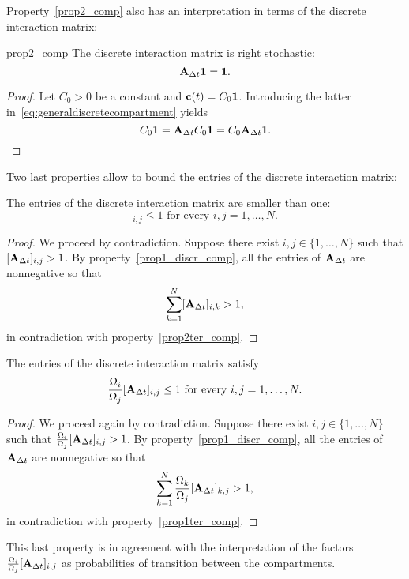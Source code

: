 Property~\ref{prop2_comp} also has an interpretation in terms of the discrete interaction matrix:
\begin{propertyter}{prop2_comp} \label{prop2ter_comp} \label{prop3_discr_comp}
	The discrete interaction matrix is right stochastic:
	\begin{equation}
		\mathbf A_{\Delta t} \mathbf 1 = \mathbf 1.
	\end{equation}
\end{propertyter}
\begin{proof}
	Let $C_0 > 0$ be a constant and $\mathbf c(t) = C_0 \mathbf 1$. Introducing the latter in~\eqref{eq:generaldiscretecompartment} yields
	\begin{equation}
		C_0 \mathbf 1 = \mathbf A_{\Delta t} C_0 \mathbf 1 = C_0 \mathbf A_{\Delta t} \mathbf 1.
	\end{equation}
\end{proof}
Two last properties allow to bound the entries of the discrete interaction matrix:
\begin{property} \label{prop4_discr_comp}
	The entries of the discrete interaction matrix are smaller than one:
	\begin{equation}
	 		[\b A_{\Delta t}]_{i,j} \le 1 \mbox{ for every } i,j = 1,\dots,N.
	\end{equation}
\end{property}
\begin{proof}
	We proceed by contradiction. Suppose there exist $i,j \in \{1,\dots,N\}$ such that $[\mathbf A_{\Delta t}]_{i,j} > 1$. By property~\ref{prop1_discr_comp}, all the entries of $\mathbf A_{\Delta t}$ are nonnegative so that
	\begin{equation}
		\sum_{k = 1}^N [\mathbf A_{\Delta t}]_{i,k} > 1,
	\end{equation}
	in contradiction with property~\ref{prop2ter_comp}.
\end{proof}
\begin{property} \label{prop5_discr_comp}
	The entries of the discrete interaction matrix satisfy
	\begin{equation}
		\frac{\Omega_i}{\Omega_j} [\mathbf A_{\Delta t}]_{i,j} \le 1 \mbox{ for every } i,j = 1,\dots,N.
	\end{equation}
\end{property}
\begin{proof}
	We proceed again by contradiction. Suppose there exist $i,j \in \{1,\dots,N\}$ such that $\frac{\Omega_i}{\Omega_j} [\mathbf A_{\Delta t}]_{i,j} > 1$. By property~\ref{prop1_discr_comp}, all the entries of $\mathbf A_{\Delta t}$ are nonnegative so that
	\begin{equation}
		\sum_{k = 1}^N \frac{\Omega_k}{\Omega_j}[\mathbf A_{\Delta t}]_{k,j} > 1,
	\end{equation}
	in contradiction with property~\ref{prop1ter_comp}.
\end{proof}
This last property is in agreement with the interpretation of the factors $\frac{\Omega_i}{\Omega_j} [\mathbf A_{\Delta t}]_{i,j}$ as probabilities of transition between the compartments.